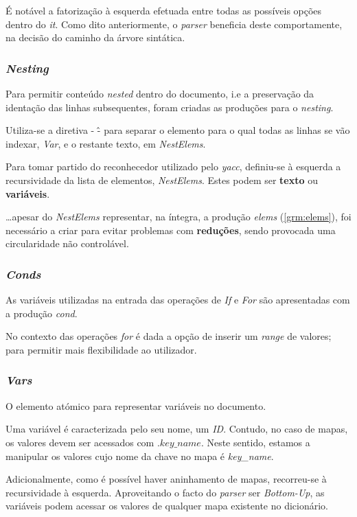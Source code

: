 \documentclass[../relatorio.tex]{subfiles}
\begin{document}
É notável a fatorização à esquerda efetuada entre todas as possíveis 
opções dentro do \textit{it}.
Como dito anteriormente, o \textit{parser} beneficia deste 
comportamente, na decisão do caminho da árvore sintática.

\subsubsection{\textit{Nesting}} \label{grm:nest}
Para permitir conteúdo \textit{nested} dentro do documento, i.e
a preservação da identação das linhas subsequentes, 
foram criadas as produções para o \textit{nesting}.

Utiliza-se a diretiva - \^ - para separar o elemento para o qual todas as 
linhas se vão indexar, \textit{Var}, e o restante texto, em \textit{NestElems}.

Para tomar partido do reconhecedor utilizado pelo \textit{yacc}, 
definiu-se à esquerda a recursividade da lista de elementos, \textit{NestElems}.
Estes podem ser \textbf{texto} ou \textbf{variáveis}.

\dots apesar do \textit{NestElems} representar, na íntegra, a produção 
\textit{elems} (\ref{grm:elems}), foi necessário a criar para evitar problemas 
com \textbf{reduções}, sendo provocada uma circularidade não controlável.

\subsubsection{\textit{Conds}} \label{grm:conds}
As variáveis utilizadas na entrada das operações de \textit{If} e
\textit{For} são apresentadas com a produção \textit{cond}.

No contexto das operações \textit{for} é dada a opção 
de inserir um \textit{range} de valores; para permitir
mais flexibilidade ao utilizador.

\subsubsection{\textit{Vars}} \label{grm:vars}
O elemento atómico para representar variáveis no documento.

Uma variável é caracterizada pelo seu nome, um \textit{ID}.
Contudo, no caso de mapas, os valores devem ser acessados 
com $.key\_name$.
Neste sentido, estamos a manipular os valores cujo nome da 
chave no mapa é \textit{key\_name}.

Adicionalmente, como é possível haver aninhamento de mapas, 
recorreu-se à recursividade à esquerda.
Aproveitando o facto do \textit{parser} ser \textit{Bottom-Up},
as variáveis podem acessar os valores de qualquer mapa 
existente no dicionário.
\end{document}
